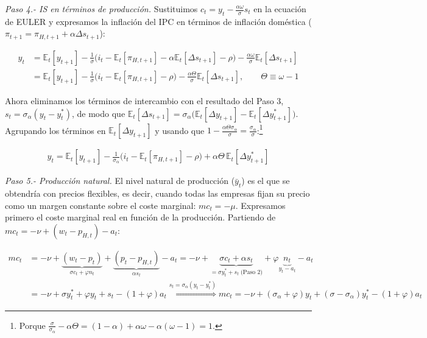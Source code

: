 \documentclass[10pt,a4paper]{article}
\begin{document}
\textit{Paso 4.- IS en términos de producción.} Sustituimos $c_t=y_t-\frac{\alpha\omega}{\sigma}s_t$ en la ecuación de EULER y expresamos la inflación del IPC en términos de inflación doméstica ($\pi_{t+1}=\pi_{H,t+1}+\alpha\Delta s_{t+1}$):

$$\begin{aligned}
    y_t&=\mathbb E_t[y_{t+1}]-\frac{1}{\sigma}\big(i_t-\mathbb E_t[\pi_{H,t+1}]-\alpha\mathbb E_t[\Delta s_{t+1}]-\rho\big)-\frac{\alpha\omega}{\sigma}\mathbb E_t[\Delta s_{t+1}]\\[0.5em]
    &=\mathbb E_t[y_{t+1}]-\frac{1}{\sigma}\big(i_t-\mathbb E_t[\pi_{H,t+1}]-\rho\big)-\frac{\alpha\Theta}{\sigma}\mathbb E_t[\Delta s_{t+1}],\qquad \Theta\equiv\omega-1
\end{aligned}$$

Ahora eliminamos los términos de intercambio con el resultado del Paso 3, $s_t=\sigma_\alpha(y_t-y_t^*)$, de modo que $\mathbb E_t[\Delta s_{t+1}]=\sigma_\alpha\big(\mathbb E_t[\Delta y_{t+1}]-\mathbb E_t[\Delta y_{t+1}^*]\big)$. Agrupando los términos en $\mathbb E_t[\Delta y_{t+1}]$ y usando que $1-\frac{\alpha\Theta\sigma_\alpha}{\sigma}=\frac{\sigma_\alpha}{\sigma}$:\footnote{%
Porque $\frac{\sigma}{\sigma_\alpha}-\alpha\Theta=(1-\alpha)+\alpha\omega-\alpha(\omega-1)=1$.
}

$$\begin{aligned}
    \boxed{y_t=\mathbb E_t[y_{t+1}]-\frac{1}{\sigma_\alpha}\big(i_t-\mathbb E_t[\pi_{H,t+1}]-\rho\big)+\alpha\Theta\,\mathbb E_t[\Delta y_{t+1}^*]}
\end{aligned}$$

\textit{Paso 5.- Producción natural.} El nivel natural de producción ($\bar y_t$) es el que se obtendría con precios flexibles, es decir, cuando todas las empresas fijan su precio como un margen constante sobre el coste marginal: $mc_t=-\mu$. Expresamos primero el coste marginal real en función de la producción. Partiendo de $mc_t=-\nu+(w_t-p_{H,t})-a_t$:

$$\begin{aligned}
    mc_t&=-\nu+\underbrace{(w_t-p_t)}_{\sigma c_t+\varphi n_t}+\underbrace{(p_t-p_{H,t})}_{\alpha s_t}-a_t=-\nu+\underbrace{\sigma c_t+\alpha s_t}_{=\sigma y_t^*+s_t\;\text{(Paso 2)}}+\varphi\underbrace{n_t}_{y_t-a_t}-a_t\\[0.5em]
    &=-\nu+\sigma y_t^*+\varphi y_t+s_t-(1+\varphi)a_t\overset{s_t=\sigma_\alpha(y_t-y_t^*)}{\Longrightarrow}\boxed{mc_t=-\nu+(\sigma_\alpha+\varphi)y_t+(\sigma-\sigma_\alpha)y_t^*-(1+\varphi)a_t}
\end{aligned}$$
\end{document}
